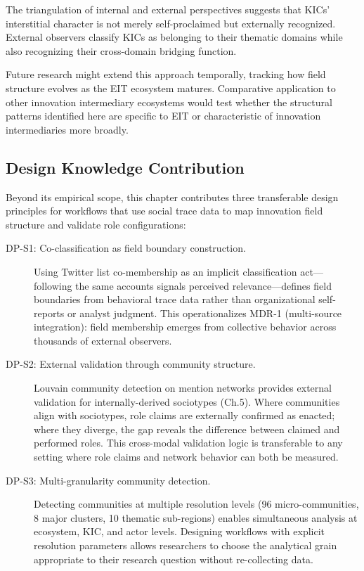 \documentclass[../main.tex]{subfiles}
\begin{document}
The triangulation of internal and external perspectives suggests that KICs' interstitial character is not merely self-proclaimed but externally recognized. External observers classify KICs as belonging to their thematic domains while also recognizing their cross-domain bridging function.

Future research might extend this approach temporally, tracking how field structure evolves as the EIT ecosystem matures. Comparative application to other innovation intermediary ecosystems would test whether the structural patterns identified here are specific to EIT or characteristic of innovation intermediaries more broadly.

\subsection{Design Knowledge Contribution}

Beyond its empirical scope, this chapter contributes three transferable design principles for workflows that use social trace data to map innovation field structure and validate role configurations:

\begin{description}
    \item[DP-S1: Co-classification as field boundary construction.] Using Twitter list co-membership as an implicit classification act---following the same accounts signals perceived relevance---defines field boundaries from behavioral trace data rather than organizational self-reports or analyst judgment. This operationalizes MDR-1 (multi-source integration): field membership emerges from collective behavior across thousands of external observers.

    \item[DP-S2: External validation through community structure.] Louvain community detection on mention networks provides external validation for internally-derived sociotypes (Ch.5). Where communities align with sociotypes, role claims are externally confirmed as enacted; where they diverge, the gap reveals the difference between claimed and performed roles. This cross-modal validation logic is transferable to any setting where role claims and network behavior can both be measured.

    \item[DP-S3: Multi-granularity community detection.] Detecting communities at multiple resolution levels (96 micro-communities, 8 major clusters, 10 thematic sub-regions) enables simultaneous analysis at ecosystem, KIC, and actor levels. Designing workflows with explicit resolution parameters allows researchers to choose the analytical grain appropriate to their research question without re-collecting data.
\end{description}
\end{document}
